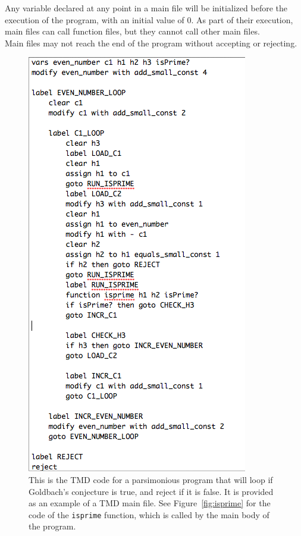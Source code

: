 \documentclass{report}
\begin{document}
Any variable declared at any point in a main file will be initialized before the execution of the program, with an initial value of 0. As part of their execution, main files can call function files, but they cannot call other main files. \\

Main files may not reach the end of the program without accepting or rejecting. 

\begin{figure} 
\begin{center} 
\includegraphics[scale=0.75]{figs/goldbach.png} 
\caption{This is the TMD code for a parsimonious program that will loop if Goldbach's conjecture is true, and reject if it is false. It is provided as an example of a TMD main file. See Figure~\ref{fig:isprime} for the code of the \texttt{isprime} function, which is called by the main body of the program.\label{fig:goldbach}} 
\end{center} 
\end{figure}
\end{document}
